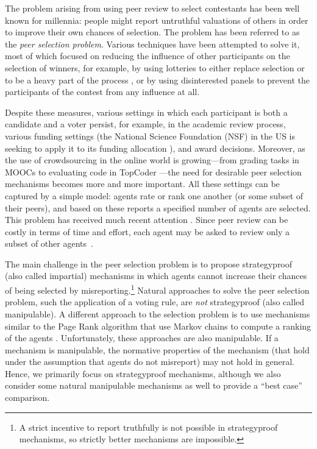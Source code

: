 \documentclass[letterpaper]{article}
\newcommand{\citep}{\cite}
\begin{document}
The problem arising from using peer review to select contestants has been well known for millennia:
people might report untruthful valuations of others in order to improve their own chances of selection.
The problem has been referred to as the \emph{peer selection problem}.
Various techniques have been attempted to solve it, most of which focused on reducing the influence of other participants on the selection of winners, for example, by using lotteries to either replace selection or to be a heavy part of the process \cite{MG07},
or by using disinterested panels to prevent the participants of the contest from any influence at all.

Despite these measures, various settings in which each participant is both a candidate and a voter persist, for example, in the academic review process, various funding settings (the National Science Foundation (NSF) in the US is seeking to apply it to its funding allocation \cite{Haze13a}), and award decisions. Moreover, as the use of crowdsourcing in the online world is growing---from grading tasks in MOOCs to evaluating code in TopCoder \cite{LGE10}---the need for desirable peer selection mechanisms becomes more and more important. All these settings can be captured by a simple model: agents rate or rank one another (or some subset of their peers), and based on these reports a specified number of agents are selected. This problem has received much recent attention \citep{AFPT11a,FeKl14a,HoMo13a,KLMP15b,RRS11a}. Since peer review can be costly in terms of time and effort, each agent may be asked to review only a subset of other agents~\citep{KLMP15b,MeSa09a}.


The main challenge in the peer selection problem is to propose strategyproof (also called impartial) mechanisms in which agents cannot increase their chances of being selected by misreporting.\footnote{A strict incentive to report truthfully is not possible in strategyproof mechanisms, so strictly better mechanisms are impossible.}
Natural approaches to solve the peer selection problem, such the application of a voting rule, are \emph{not} strategyproof (also called manipulable).
A different approach to the selection problem is to use mechanisms similar to the Page Rank algorithm that use Markov chains to compute a ranking of the agents \cite{Wals14a}. Unfortunately, these approaches are also manipulable. If a mechanism is manipulable, the normative properties of the mechanism (that hold under the assumption that agents do not misreport) may not hold in general. Hence, we primarily focus on strategyproof mechanisms, although we also consider some natural manipulable mechanisms as well to provide a ``best case'' comparison.
\end{document}

